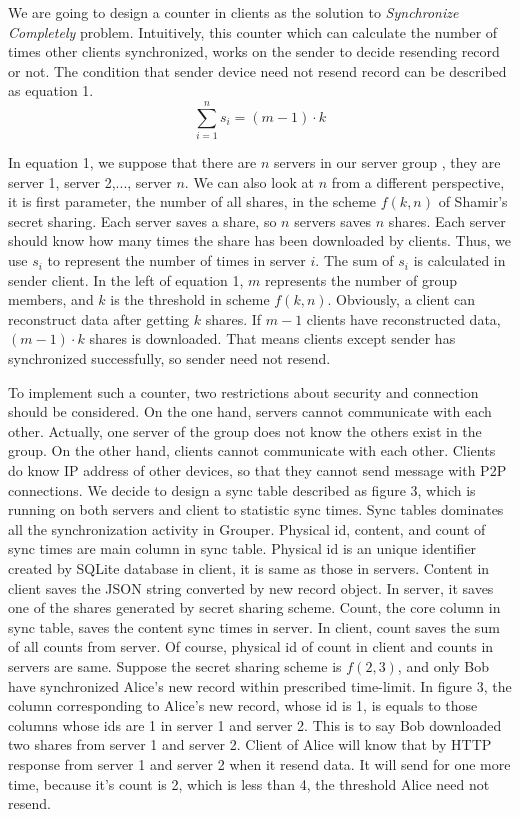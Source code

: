 \documentclass[twocolumn,10pt]{article}
\begin{document}
We are going to design a counter in clients as the solution to \emph{Synchronize Completely} problem. Intuitively, this counter which can calculate the number of times other clients synchronized, works on the sender to decide resending record or not. The condition that sender device need not resend record can be described as equation 1.
\begin{equation}
\sum_{i=1}^{n}s_{i}=(m-1)\cdot k
\end{equation}

In equation 1, we suppose that there are $n$ servers in our server group , they are server 1, server 2,..., server $n$. We can also look at $n$ from a different perspective, it is first parameter, the number of all shares, in the scheme $f(k, n)$ of Shamir's secret sharing. Each server saves a share, so $n$ servers saves $n$ shares. Each server should know how many times the share has been downloaded by clients. Thus, we use $s_i$ to represent the number of times in server $i$. The sum of $s_i$ is calculated in sender client. In the left of equation 1, $m$ represents the number of group members, and $k$ is the threshold in scheme $f(k, n)$. Obviously, a client can reconstruct data after getting $k$ shares. If $m-1$ clients have reconstructed data, $(m-1)\cdot k$ shares is downloaded. That means clients except sender has synchronized successfully, so sender need not resend.

To implement such a counter, two restrictions about security and connection should be considered. On the one hand, servers cannot communicate with each other. Actually, one server of the group does not know the others exist in the group. On the other hand, clients cannot communicate with each other. Clients do know IP address of other devices, so that they cannot send message with P2P connections. We decide to design a sync table described as figure 3, which is running on both servers and client to statistic sync times. Sync tables dominates all the synchronization activity in Grouper. Physical id, content, and count of sync times are main column in sync table. Physical id is an unique identifier created by SQLite database in client, it is same as those in servers. Content in client saves the JSON string converted by new record object. In server, it saves one of the shares generated by secret sharing scheme. Count, the core column in sync table, saves the content sync times in server. In client, count saves the sum of all counts from server. Of course, physical id of count in client and counts in servers are same. Suppose the secret sharing scheme is $f(2, 3)$, and only Bob have synchronized Alice's new record within prescribed time-limit. In figure 3, the column corresponding to Alice's new record, whose id is 1, is equals to those columns whose ids are 1 in server 1 and server 2. This is to say Bob downloaded two shares from server 1 and server 2. Client of Alice will know that by HTTP response from server 1 and server 2 when it resend data. It will send for one more time, because it's count is 2, which is less than 4, the threshold Alice need not resend.
\end{document}

